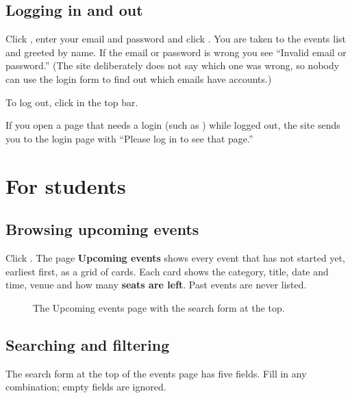 \documentclass[11pt,a4paper]{article}
\begin{document}
\subsection{Logging in and out}

Click , enter your email and password and click . You are taken to the
events list and greeted by name. If the email or password is wrong you see
``Invalid email or password.'' (The site deliberately does not say which one was wrong, so nobody
can use the login form to find out which emails have accounts.)

To log out, click  in the top bar.

\begin{tip}
If you open a page that needs a login (such as ) while logged out, the
site sends you to the login page with ``Please log in to see that page.''
\end{tip}

\section{For students}
\label{sec:student}

\subsection{Browsing upcoming events}

Click . The page \textbf{Upcoming events} shows every event that has not started yet,
earliest first, as a grid of cards. Each card shows the category, title, date and time, venue and
how many \textbf{seats are left}. Past events are never listed.

\begin{figure}[H]
\centering
{}
\caption{The Upcoming events page with the search form at the top.}
\label{fig:um-search}
\end{figure}

\subsection{Searching and filtering}

The search form at the top of the events page has five fields. Fill in any combination; empty
fields are ignored.
\end{document}
